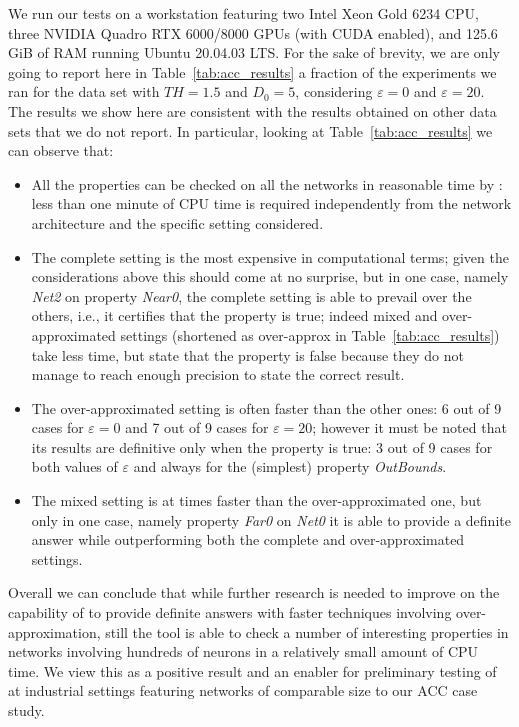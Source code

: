 We run our tests on a workstation featuring two
Intel Xeon Gold 6234 CPU, three NVIDIA Quadro RTX 6000/8000 GPUs (with
CUDA enabled), and 125.6 GiB of RAM running Ubuntu 20.04.03 LTS. For
the sake of brevity, we are only going to report here in 
Table~\ref{tab:acc_results} a fraction of the experiments we ran for 
the data set with $TH = 1.5$ and $D_0 = 5$, considering 
$\varepsilon = 0$ and $\varepsilon = 20$. The results we show here are 
consistent with the results obtained on other data sets that we do not 
report. In particular, looking at Table~\ref{tab:acc_results} we can 
observe that:
%
\begin{itemize}
	\item All the properties can be checked on all the networks in
		reasonable time by \nevertwo: less than one minute of CPU time is
		required independently from the network architecture and the
		specific setting considered.
	\item The complete setting is the most expensive in computational
		terms; given the considerations above this should come at no
		surprise, but in one case, namely \textit{Net2} on property
	\textit{Near0}, the complete setting is able to prevail over the 
		others, i.e., it certifies that the property is true; indeed mixed and
		over-approximated settings (shortened as over-approx in
		Table~\ref{tab:acc_results}) take less time, but state that the
		property is false because they do not manage to reach enough
		precision to state the correct result.
	\item The over-approximated setting is often faster than the other
		ones: 6 out of 9 cases for $\varepsilon = 0$ and 7 out of 9
		cases for $\varepsilon = 20$; however it must be noted that its
		results are definitive only when the property is true: 3 out of 9
		cases for both values of $\varepsilon$ and always for the (simplest)
		property \textit{OutBounds}.
	\item The mixed setting is at times faster than the
		over-approximated one, but only in one case, namely property
	\textit{Far0} on \textit{Net0} it is able to provide a definite
		answer while outperforming both the complete and over-approximated
		settings. 
\end{itemize}
%
Overall we can conclude that while further research is needed to improve 
on the capability of \nevertwo{} to provide definite answers with
faster techniques involving over-approximation, still the tool is able
to check a number of interesting properties in networks involving
hundreds of neurons in a relatively small amount of CPU time. We view
this as a positive result and an enabler for preliminary testing of
\nevertwo{} at industrial settings featuring networks of comparable size
to our ACC case study.

